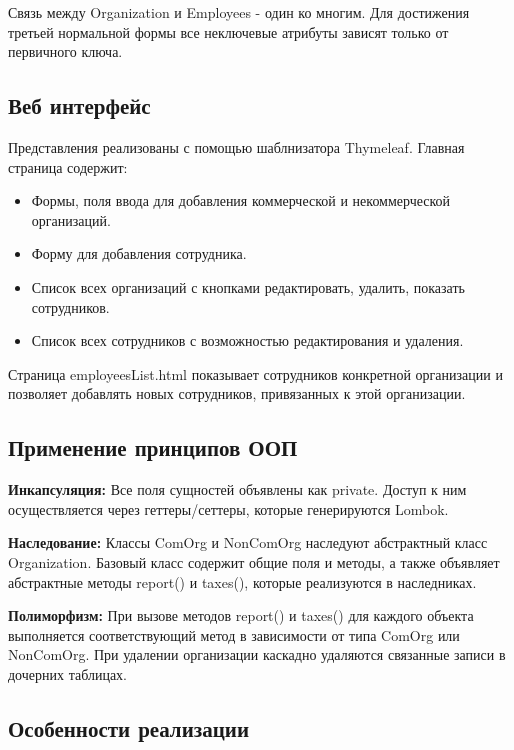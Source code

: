 \documentclass[oneside,a4paper,14pt]{extarticle}
\begin{document}
Связь между Organization и Employees - один ко многим. Для достижения третьей нормальной формы все неключевые атрибуты зависят только от первичного ключа.

\subsection*{Веб интерфейс}

Представления реализованы с помощью шаблнизатора Thymeleaf. Главная страница содержит:

\begin{itemize}
    \item Формы, поля ввода для добавления коммерческой и некоммерческой организаций.
    \item Форму для добавления сотрудника.
    \item Список всех организаций с кнопками редактировать, удалить, показать сотрудников.
    \item Список всех сотрудников с возможностью редактирования и удаления.
\end{itemize}

Страница employeesList.html показывает сотрудников конкретной организации и позволяет добавлять новых сотрудников, привязанных к этой организации.

\subsection*{Применение принципов ООП}

\textbf{Инкапсуляция:}
Все поля сущностей объявлены как private. Доступ к ним осуществляется через геттеры/сеттеры, которые генерируются Lombok.

\textbf{Наследование:}
Классы ComOrg и NonComOrg наследуют абстрактный класс Organization. Базовый класс содержит общие поля и методы, а также объявляет абстрактные методы report() и taxes(), которые реализуются в наследниках.

\textbf{Полиморфизм:}
При вызове методов report() и taxes() для каждого объекта выполняется соответствующий метод в зависимости от типа ComOrg или NonComOrg. При удалении организации каскадно удаляются связанные записи в дочерних таблицах.

\subsection*{Особенности реализации}
\end{document}
